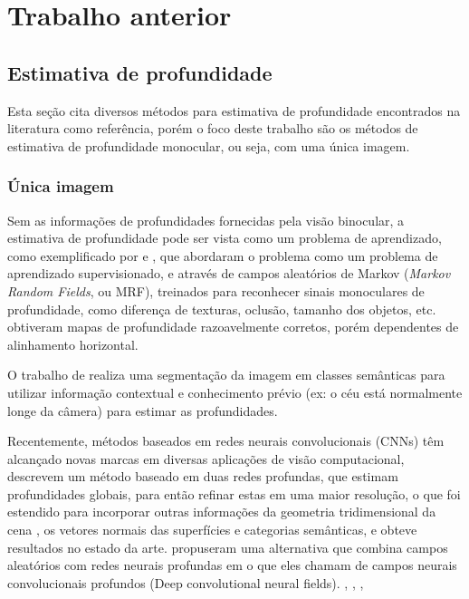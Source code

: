 \documentclass[cic,tc]{iiufrgs}
\begin{document}
\chapter{Trabalho anterior}

\section{Estimativa de profundidade}

Esta seção cita diversos métodos para estimativa de profundidade encontrados na literatura como referência, porém o foco deste trabalho são os métodos de estimativa de profundidade monocular, ou seja, com uma única imagem.

\subsection{Única imagem}

Sem as informações de profundidades fornecidas pela visão binocular, a estimativa de profundidade pode ser vista como um problema de aprendizado, como exemplificado por \citet{Saxena2005} e \citet{Saxena2008}, que abordaram o problema como um problema de aprendizado supervisionado, e através de campos aleatórios de Markov (\textit{Markov Random Fields}, ou MRF), treinados para reconhecer sinais monoculares de profundidade, como diferença de texturas, oclusão, tamanho dos objetos, etc. obtiveram mapas de profundidade razoavelmente corretos, porém dependentes de alinhamento horizontal.

O trabalho de \citet{Liu2010} realiza uma segmentação da imagem em classes semânticas para utilizar informação contextual e conhecimento prévio (ex: o céu está normalmente longe da câmera) para estimar as profundidades.

Recentemente, métodos baseados em redes neurais convolucionais (CNNs) têm alcançado novas marcas em diversas aplicações de visão computacional, \citet{Eigen2014} descrevem um método baseado em duas redes profundas, que estimam profundidades globais, para então refinar estas em uma maior resolução, o que foi estendido para incorporar outras informações da geometria tridimensional da cena \citep{Eigen2015}, os vetores normais das superfícies e categorias semânticas, e obteve resultados no estado da arte. \citet{Fayao2015} propuseram uma alternativa que combina campos aleatórios com redes neurais profundas em o que eles chamam de campos neurais convolucionais profundos (Deep convolutional neural fields).
, , \citet{Kuznietsov2017}, \citet{Li2017}
\end{document}
